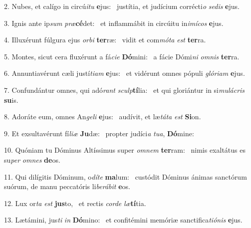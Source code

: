 2. Nubes, et calígo in circú\textit{i}\textit{tu} \textbf{e}jus: \ast\  justítia, et judícium corrécti\textit{o} \textit{se}\textit{dis} \textbf{e}jus.\

3. Ignis ante ip\textit{sum} \textit{præ}\textbf{cé}det: \ast\  et inflammábit in circúitu in\textit{i}\textit{mí}\textit{cos} \textbf{e}jus.\

4. Illuxérunt fúlgura ejus \textit{or}\textit{bi} \textbf{ter}ræ: \ast\  vidit et com\textit{mó}\textit{ta} \textit{est} \textbf{ter}ra.\

5. Montes, sicut cera fluxérunt a fá\textit{ci}\textit{e} \textbf{Dó}mini: \ast\  a fácie Dómi\textit{ni} \textit{om}\textit{nis} \textbf{ter}ra.\

6. Annuntiavérunt cæli justí\textit{ti}\textit{am} \textbf{e}jus: \ast\  et vidérunt omnes pópuli \textit{gló}\textit{ri}\textit{am} \textbf{e}jus.\

7. Confundántur omnes, qui adó\textit{rant} \textit{sculp}\textbf{tí}lia: \ast\  et qui gloriántur in si\textit{mu}\textit{lá}\textit{cris} \textbf{su}is.\

8. Adoráte eum, omnes An\textit{ge}\textit{li} \textbf{e}jus: \ast\  audívit, et læ\textit{tá}\textit{ta} \textit{est} \textbf{Si}on.\

9. Et exsultavérunt fí\textit{li}\textit{æ} \textbf{Ju}dæ: \ast\  propter judíci\textit{a} \textit{tu}\textit{a}, \textbf{Dó}mine:\

10. Quóniam tu Dóminus Altíssimus super \textit{om}\textit{nem} \textbf{ter}ram: \ast\  nimis exaltátus es su\textit{per} \textit{om}\textit{nes} \textbf{de}os.\

11. Qui dilígitis Dóminum, o\textit{dí}\textit{te} \textbf{ma}lum: \ast\  custódit Dóminus ánimas sanctórum suórum, de manu peccatóris li\textit{be}\textit{rá}\textit{bit} \textbf{e}os.\

12. Lux or\textit{ta} \textit{est} \textbf{jus}to, \ast\  et rectis \textit{cor}\textit{de} \textit{læ}\textbf{tí}tia.\

13. Lætámini, jus\textit{ti} \textit{in} \textbf{Dó}mino: \ast\  et confitémini memóriæ sanctifica\textit{ti}\textit{ó}\textit{nis} \textbf{e}jus.\

